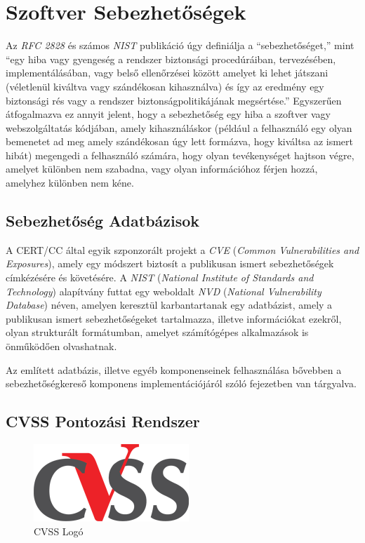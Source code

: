 \documentclass[a4paper,12pt]{article}
\begin{document}
\section{Szoftver Sebezhetőségek}
	
	Az \textit{RFC 2828} és számos \textit{NIST} publikáció úgy definiálja a ``sebezhetőséget,'' mint ``egy hiba vagy gyengeség a rendszer biztonsági procedúráiban, tervezésében, implementálásában, vagy belső ellenőrzései között amelyet ki lehet játszani (véletlenül kiváltva vagy szándékosan kihasználva) és így az eredmény egy biztonsági rés vagy a rendszer biztonságpolitikájának megsértése.''\cite{rfc2828,nist80030} Egyszerűen átfogalmazva ez annyit jelent, hogy a sebezhetőség egy hiba a szoftver vagy webszolgáltatás kódjában, amely kihasználáskor (például a felhasználó egy olyan bemenetet ad meg amely szándékosan úgy lett formázva, hogy kiváltsa az ismert hibát) megengedi a felhasználó számára, hogy olyan tevékenységet hajtson végre, amelyet különben nem szabadna, vagy olyan információhoz férjen hozzá, amelyhez különben nem kéne.
	
\subsection{Sebezhetőség Adatbázisok}
	
	A CERT/CC által egyik szponzorált projekt a \textit{CVE} (\textit{Common Vulnerabilities and Exposures}), amely egy módszert biztosít a publikusan ismert sebezhetőségek címkézésére és követésére. A \textit{NIST} (\textit{National Institute of Standards and Technology}) alapítvány futtat egy weboldalt \textit{NVD} (\textit{National Vulnerability Database}) néven, amelyen keresztül karbantartanak egy adatbázist, amely a publikusan ismert sebezhetőségeket tartalmazza, illetve információkat ezekről, olyan strukturált formátumban, amelyet számítógépes alkalmazások is önműködően olvashatnak\cite{nvd15}.
	
	Az említett adatbázis, illetve egyéb komponenseinek felhasználása bővebben a sebezhetőségkereső komponens implementációjáról szóló fejezetben van tárgyalva.
	
\subsection{CVSS Pontozási Rendszer}
	
	\begin{figure}
		\vspace{-10pt}
		\centering
		\includegraphics[scale=0.4]{cvss.png}
		\caption{CVSS Logó}
	\end{figure}
	
\end{document}
